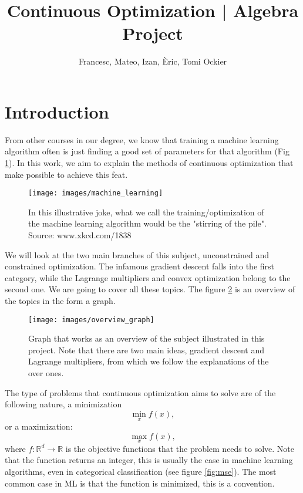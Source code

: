 \documentclass[]{article}
\title{Continuous Optimization | Algebra Project}
\author{Francesc, Mateo, Izan, Èric, Tomi Ockier}
\theoremstyle{definition}
\begin{document}
\maketitle
\tableofcontents

\section{Introduction}
From other courses in our degree, we know that training a machine learning algorithm often is just finding a good set of parameters for that algorithm (Fig \ref{fig:ml_joke}). In this work, we aim to explain the methods of continuous optimization that make possible to achieve this feat. 

\begin{figure}[h]
	\centering
	\captionsetup{width=.9\linewidth}
	\texttt{[image: images/machine\_learning]}
	\caption{In this illustrative joke, what we call the training/optimization of the machine learning algorithm would be the "stirring of the pile". Source: www.xkcd.com/1838}
	\label{fig:ml_joke}
\end{figure}

We will look at the two main branches of this subject, unconstrained and constrained optimization. The infamous gradient descent falls into the first category, while the Lagrange multipliers and convex optimization belong to the second one. We are going to cover all these topics. The figure \ref{fig:overviewgraph} is an overview of the topics in the form a graph.
\begin{figure}[h!]
	\centering
	\captionsetup{width=.9\linewidth}
	\texttt{[image: images/overview\_graph]}
	\caption{Graph that works as an overview of the subject illustrated in this project. Note that there are two main ideas, gradient descent and Lagrange multipliers, from which we follow the explanations of the over ones. }
	\label{fig:overviewgraph}
\end{figure}

The type of problems that continuous optimization aims to solve are of the following nature, a minimization
\begin{equation}
	 \min_x f(x),
\end{equation}
or a maximization:
\begin{equation}
	\max_x f(x),
\end{equation}
where $f:\mathbb{R}^d \rightarrow \mathbb{R}$ is the objective functions that the problem needs to solve. Note that the function returns an integer, this is usually the case in machine learning algorithms, even in categorical classification (see figure \ref{fig:mse}). The most common case in ML is that the function is minimized, this is a convention.
\end{document}

